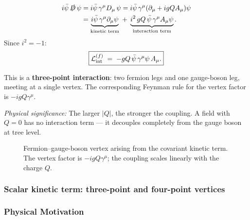 \documentclass[../main.tex]{subfiles}
\begin{document}
\begin{align}
  i\bar\psi\,\slashed{D}\,\psi
  &= i\bar\psi\,\gamma^\mu D_\mu\,\psi
   = i\bar\psi\,\gamma^\mu(\partial_\mu + igQA_\mu)\psi \nonumber\\
  &= \underbrace{i\bar\psi\,\gamma^\mu\partial_\mu\psi}_{\text{kinetic term}}
    \;+\; \underbrace{i^2\, gQ\,\bar\psi\,\gamma^\mu A_\mu\psi}_{\text{interaction term}}.
  \label{eq:lec11:fermion-expand}
\end{align}
Since $i^2=-1$:
\begin{equation}
  \boxed{
  \mathcal{L}_{\rm int}^{(f)} \;=\; -gQ\,\bar\psi\,\gamma^\mu\psi\, A_\mu.}
  \label{eq:lec11:fermion-vertex}
\end{equation}

This is a \textbf{three-point interaction}: two fermion legs and one gauge-boson leg, meeting at a single vertex.  The corresponding Feynman rule for the vertex factor is $-igQ\gamma^\mu$.

\textit{Physical significance:} The larger $|Q|$, the stronger the coupling.  A field with $Q=0$ has no interaction term — it decouples completely from the gauge boson at tree level.

\begin{figure}[h]
  \centering
  \caption{Fermion--gauge-boson vertex arising from the covariant kinetic term.  The vertex factor is $-igQ\gamma^\mu$; the coupling scales linearly with the charge $Q$.}
  \label{fig:lec11:fermion-vertex}
\end{figure}

\subsubsection*{Scalar kinetic term: three-point and four-point vertices}

\subsubsection*{Physical Motivation}
\end{document}
